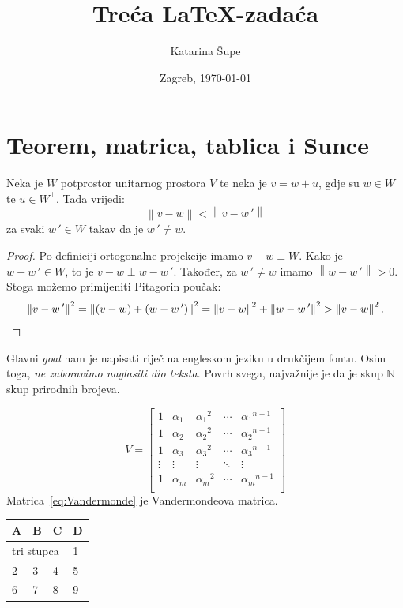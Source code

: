 \documentclass[12pt]{scrartcl}
\newcommand{\norm}[1]{\left\|#1\right\|}
\newcommand{\tick}[1]{#1\,'}
\begin{document}
\title{Treća LaTeX-zadaća}
\author{Katarina Šupe}
\date{Zagreb, \today}
\maketitle
\tableofcontents
\section{Teorem, matrica, tablica i Sunce}
\begin{teorem}\label{tm:aproksimacija}
Neka je $W$ potprostor unitarnog prostora $V$ te neka je $v = w + u$, gdje su $w\in W$ te $u \in W^{\perp}$. Tada vrijedi: 
\[
\norm{v-w} < \norm{v-\tick{w}}
\]
za svaki $\tick{w}\in W$ takav da je $\tick{w} \neq w$.
\end{teorem}
\begin{proof}
Po definiciji ortogonalne projekcije imamo $v-w \perp W$. Kako je $w-\tick{w} \in W$, to je $v-w \perp w-\tick{w}$. Također, za $\tick{w} \neq w$ imamo $\norm{w-\tick{w}}>0$. Stoga možemo primijeniti Pitagorin poučak:
\[
\norm{v-\tick{w}}^2 = \norm{(v-w) + (w-\tick{w})}^2 = \norm{v-w}^2 + \norm{w-\tick{w}}^2 > \norm{v-w}^2\text.\qedhere
\]
\end{proof}

Glavni \textsl{goal} nam je napisati riječ na engleskom jeziku u drukčijem fontu. Osim toga, \emph{ne zaboravimo naglasiti dio teksta}. Povrh svega, najvažnije je da je skup $\mathbb{N}$ skup prirodnih brojeva. 

\begin{equation}\label{eq:Vandermonde}
V=\begin{bmatrix}
1 & \alpha_1 & {\alpha_1}^2 & \cdots & {\alpha_1}^{n-1} \\
1 & \alpha_2 & {\alpha_2}^2 & \cdots & {\alpha_2}^{n-1} \\
1 & \alpha_3 & {\alpha_3}^2 & \cdots & {\alpha_3}^{n-1} \\
\vdots &\vdots & \vdots & \ddots & \vdots \\
1 & \alpha_m & {\alpha_m}^2 & \cdots & {\alpha_m}^{n-1} \\
\end{bmatrix}
\end{equation}
Matrica~\eqref{eq:Vandermonde} je Vandermondeova matrica.
\begin{table}[ht]
\centering
\begin{tabular}{llll}
   A & B & C & D \\ \hline
\multicolumn{3}{l}{tri stupca} & 1\\
   2 & 3 & 4 & 5 \\
   6 & 7 & 8 & 9
\end{tabular}
\end{table}
\end{document}
